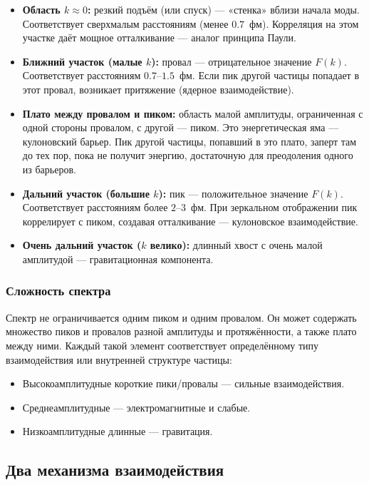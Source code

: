 \documentclass[12pt,a4paper]{article}
\begin{document}
\begin{itemize}
    \item \textbf{Область $k \approx 0$:} резкий подъём (или спуск) --- «стенка» вблизи начала моды. Соответствует сверхмалым расстояниям (менее $0.7$~фм). Корреляция на этом участке даёт мощное отталкивание --- аналог принципа Паули.
    \item \textbf{Ближний участок (малые $k$):} провал --- отрицательное значение $F(k)$. Соответствует расстояниям $0.7$--$1.5$~фм. Если пик другой частицы попадает в этот провал, возникает притяжение (ядерное взаимодействие).
    \item \textbf{Плато между провалом и пиком:} область малой амплитуды, ограниченная с одной стороны провалом, с другой --- пиком. Это энергетическая яма --- кулоновский барьер. Пик другой частицы, попавший в это плато, заперт там до тех пор, пока не получит энергию, достаточную для преодоления одного из барьеров.
    \item \textbf{Дальний участок (большие $k$):} пик --- положительное значение $F(k)$. Соответствует расстояниям более $2$--$3$~фм. При зеркальном отображении пик коррелирует с пиком, создавая отталкивание --- кулоновское взаимодействие.
    \item \textbf{Очень дальний участок ($k$ велико):} длинный хвост с очень малой амплитудой --- гравитационная компонента.
\end{itemize}

\subsubsection{Сложность спектра}
Спектр не ограничивается одним пиком и одним провалом. Он может содержать множество пиков и провалов разной амплитуды и протяжённости, а также плато между ними. Каждый такой элемент соответствует определённому типу взаимодействия или внутренней структуре частицы:

\begin{itemize}
    \item Высокоамплитудные короткие пики/провалы --- сильные взаимодействия.
    \item Среднеамплитудные --- электромагнитные и слабые.
    \item Низкоамплитудные длинные --- гравитация.
\end{itemize}

\subsection{Два механизма взаимодействия}
\end{document}

